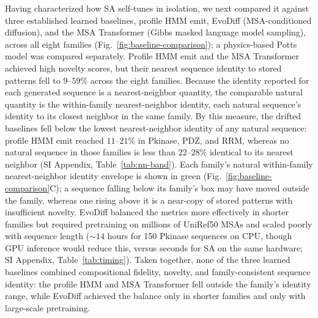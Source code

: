 Having characterized how SA self-tunes in isolation, we next compared it against three established learned baselines, profile HMM emit, EvoDiff (MSA-conditioned diffusion), and the MSA Transformer (Gibbs masked language model sampling), across all eight families (Fig.~\ref{fig:baseline-comparison}); a physics-based Potts model was compared separately. Profile HMM emit and the MSA Transformer achieved high novelty scores, but their nearest sequence identity to stored patterns fell to $9$--$59\%$ across the eight families. Because the identity reported for each generated sequence is a nearest-neighbor quantity, the comparable natural quantity is the within-family nearest-neighbor identity, each natural sequence's identity to its closest neighbor in the same family. By this measure, the drifted baselines fell below the lowest nearest-neighbor identity of any natural sequence: profile HMM emit reached $11$--$21\%$ in Pkinase, PDZ, and RRM, whereas no natural sequence in those families is less than $22$--$28\%$ identical to its nearest neighbor (SI Appendix, Table~\ref{tab:nn-band}). Each family's natural within-family nearest-neighbor identity envelope is shown in green (Fig.~\ref{fig:baseline-comparison}C); a sequence falling below its family's box may have moved outside the family, whereas one rising above it is a near-copy of stored patterns with insufficient novelty. EvoDiff balanced the metrics more effectively in shorter families but required pretraining on millions of UniRef50 MSAs and scaled poorly with sequence length (${\sim}14$ hours for 150 Pkinase sequences on CPU, though GPU inference would reduce this, versus seconds for SA on the same hardware; SI Appendix, Table~\ref{tab:timing}). Taken together, none of the three learned baselines combined compositional fidelity, novelty, and family-consistent sequence identity: the profile HMM and MSA Transformer fell outside the family's identity range, while EvoDiff achieved the balance only in shorter families and only with large-scale pretraining.

